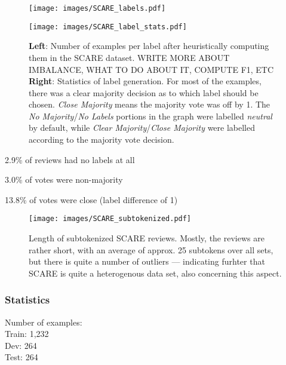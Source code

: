 \begin{figure}
  \begin{minipage}{0.45\linewidth}
  \vspace{0pt}
    \texttt{[image: images/SCARE\_labels.pdf]}
  \end{minipage}
  \hfill
  \begin{minipage}{0.45\linewidth}
  \vspace{0pt}
    \texttt{[image: images/SCARE\_label\_stats.pdf]}
  \end{minipage}
  \caption[Accumulated Gains and Losses.]{\textbf{Left}: Number of examples per label after heuristically computing them in the SCARE dataset. {\color{red} WRITE MORE ABOUT IMBALANCE, WHAT TO DO ABOUT IT, COMPUTE F1, ETC} \textbf{Right}: Statistics of label generation. For most of the examples, there was a clear majority decision as to which label should be chosen. \emph{Close Majority} means the majority vote was off by 1. The \emph{No Majority}/\emph{No Labels} portions in the graph were labelled \emph{neutral} by default, while \emph{Clear Majority}/\emph{Close Majority}  were labelled according to the majority vote decision.}
\end{figure}

2.9\% of reviews had no labels at all

3.0\% of votes were non-majority

13.8\% of votes were close (label difference of 1)

\begin{wrapfigure}{r}{0.45\linewidth}
  \centering
    \texttt{[image: images/SCARE\_subtokenized.pdf]}
  \caption[SCARE Lengths]{Length of subtokenized SCARE reviews. Mostly, the reviews are rather short, with an average of approx. 25 subtokens over all sets,
                        but there is quite a number of outliers --- indicating furhter that SCARE is quite a heterogenous data set, also concerning this aspect.}
\end{wrapfigure}


\subsubsection{Statistics}

Number of examples: \\
Train: 1,232 \\
Dev: 264 \\
Test: 264

